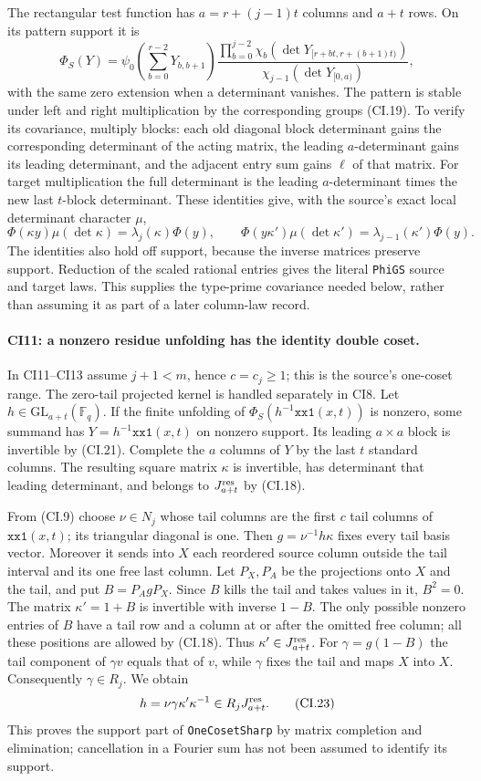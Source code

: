 The rectangular test function has $a=r+(j-1)t$ columns and
$a+t$ rows. On its pattern support it is
\[
 \Phi_S(Y)=\psi_0\!\left(\sum_{b=0}^{r-2}Y_{b,b+1}\right)
 \frac{\prod_{b=0}^{j-2}\chi_b(\det Y_{[r+bt,r+(b+1)t)})}
      {\chi_{j-1}(\det Y_{[0,a)})},
 \tag{CI.21}
\]
with the same zero extension when a determinant vanishes.
The pattern is stable under left and right multiplication by
the corresponding groups (CI.19). To verify its covariance,
multiply blocks: each old diagonal block determinant gains the
corresponding determinant of the acting matrix, the leading
$a$-determinant gains its leading determinant, and the adjacent
entry sum gains $\ell$ of that matrix. For target multiplication
the full determinant is the leading $a$-determinant times the
new last $t$-block determinant. These identities give, with the
source's exact local determinant character $\mu$,
\[
 \Phi(\kappa y)\mu(\det\kappa)
    =\lambda_j(\kappa)\Phi(y),\qquad
 \Phi(y\kappa')\mu(\det\kappa')
    =\lambda_{j-1}(\kappa')\Phi(y).
 \tag{CI.22}
\]
The identities also hold off support, because the inverse
matrices preserve support. Reduction of the scaled rational
entries gives the literal \texttt{PhiGS} source and target
laws. This supplies the type-prime covariance needed below,
rather than assuming it as part of a later column-law record.

\paragraph{CI11: a nonzero residue unfolding has the identity double coset.}
In CI11--CI13 assume $j+1<m$, hence $c=c_j\ge1$; this is
the source's one-coset range. The zero-tail projected kernel
is handled separately in CI8.
Let $h\in\mathrm{GL}_{a+t}(\mathbb F_q)$. If the finite
unfolding of $\Phi_S(h^{-1}\texttt{xx1}(x,t))$ is nonzero,
some summand has $Y=h^{-1}\texttt{xx1}(x,t)$ on nonzero support.
Its leading $a\times a$ block is invertible by (CI.21).
Complete the $a$ columns of $Y$ by the last $t$ standard columns.
The resulting square matrix $\kappa$ is invertible, has determinant
that leading determinant, and belongs to $J_{a+t}^{\rm res}$
by (CI.18).

From (CI.9) choose $\nu\in N_j$ whose tail columns are the first
$c$ tail columns of $\texttt{xx1}(x,t)$; its triangular diagonal
is one. Then $g=\nu^{-1}h\kappa$ fixes every tail basis vector.
Moreover it sends into $X$ each reordered source column outside
the tail interval and its one free last column. Let $P_X,P_A$
be the projections onto $X$ and the tail, and put
$B=P_AgP_X$. Since $B$ kills the tail and takes values in it,
$B^2=0$. The matrix $\kappa'=1+B$ is invertible with inverse
$1-B$. The only possible nonzero entries of $B$ have a tail row
and a column at or after the omitted free column; all these
positions are allowed by (CI.18). Thus $\kappa'\in J_{a+t}^{\rm res}$.
For $\gamma=g(1-B)$ the tail component of $\gamma v$ equals that
of $v$, while $\gamma$ fixes the tail and maps $X$ into $X$.
Consequently $\gamma\in R_j$. We obtain
\[
 h=\nu\gamma\kappa'\kappa^{-1}\in R_jJ_{a+t}^{\rm res}.
 \tag{CI.23}
\]
This proves the support part of \texttt{OneCosetSharp} by matrix
completion and elimination; cancellation in a Fourier sum has
not been assumed to identify its support.

